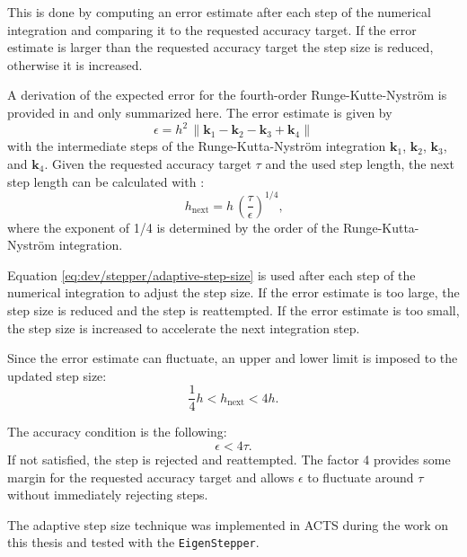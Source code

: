 This is done by computing an error estimate after each step of the numerical integration and comparing it to the requested accuracy target. If the error estimate is larger than the requested accuracy target the step size is reduced, otherwise it is increased.

A derivation of the expected error for the fourth-order Runge-Kutte-Nyström is provided in \textcite{pub-2009-001} and only summarized here. The error estimate is given by
\begin{equation}
    \epsilon = h^2 \, \left\lVert \mathbf{k}_1 - \mathbf{k}_2 - \mathbf{k}_3 + \mathbf{k}_4 \right\rVert
\end{equation}
with the intermediate steps of the Runge-Kutta-Nyström integration $\mathbf{k}_1$, $\mathbf{k}_2$, $\mathbf{k}_3$, and $\mathbf{k}_4$. Given the requested accuracy target $\tau$ and the used step length, the next step length can be calculated with \cite{pub-2009-001}\cite{numerical-recipes}:
\begin{equation}
    h_{\text{next}} = h \, \left( \frac{\tau}{\epsilon} \right)^{1/4} \text{,}
    \label{eq:dev/stepper/adaptive-step-size}
\end{equation}
where the exponent of 1/4 is determined by the order of the Runge-Kutta-Nyström integration.

Equation \ref{eq:dev/stepper/adaptive-step-size} is used after each step of the numerical integration to adjust the step size. If the error estimate is too large, the step size is reduced and the step is reattempted. If the error estimate is too small, the step size is increased to accelerate the next integration step.

Since the error estimate can fluctuate, an upper and lower limit is imposed to the updated step size:
\begin{equation}
    \frac{1}{4} h < h_{\text{next}} < 4 h \text{.}
\end{equation}

The accuracy condition is the following:
\begin{equation}
    \epsilon < 4 \tau \text{.}
\end{equation}
If not satisfied, the step is rejected and reattempted. The factor 4 provides some margin for the requested accuracy target and allows $\epsilon$ to fluctuate around $\tau$ without immediately rejecting steps.

The adaptive step size technique was implemented in ACTS during the work on this thesis and tested with the \texttt{EigenStepper}.


